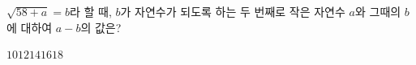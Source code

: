 $\sqrt{58+a}=b$라 할 때, $b$가 자연수가 되도록 하는 두 번째로 작은 자연수 $a$와 그때의 $b$에 대하여 $a-b$의 값은?
\begin{choices32}{$10$}{$12$}{$14$}{$16$}{$18$}\end{choices32}
